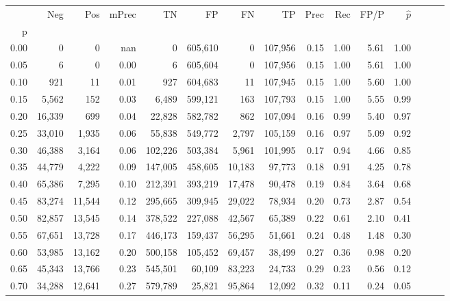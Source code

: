 \begin{tabular}{rrrrrrrrrrrrrrr}
\toprule
{} &     Neg &     Pos & mPrec &       TN &       FP &       FN &       TP &  Prec &   Rec &  FP/P & $\hat{p}$ \\
p    &         &         &       &          &          &          &          &       &       &       &           \\
\midrule
0.00 &       0 &       0 &   nan &        0 &  605,610 &        0 &  107,956 &  0.15 &  1.00 &  5.61 &      1.00 \\
0.05 &       6 &       0 &  0.00 &        6 &  605,604 &        0 &  107,956 &  0.15 &  1.00 &  5.61 &      1.00 \\
0.10 &     921 &      11 &  0.01 &      927 &  604,683 &       11 &  107,945 &  0.15 &  1.00 &  5.60 &      1.00 \\
0.15 &   5,562 &     152 &  0.03 &    6,489 &  599,121 &      163 &  107,793 &  0.15 &  1.00 &  5.55 &      0.99 \\
0.20 &  16,339 &     699 &  0.04 &   22,828 &  582,782 &      862 &  107,094 &  0.16 &  0.99 &  5.40 &      0.97 \\
0.25 &  33,010 &   1,935 &  0.06 &   55,838 &  549,772 &    2,797 &  105,159 &  0.16 &  0.97 &  5.09 &      0.92 \\
0.30 &  46,388 &   3,164 &  0.06 &  102,226 &  503,384 &    5,961 &  101,995 &  0.17 &  0.94 &  4.66 &      0.85 \\
0.35 &  44,779 &   4,222 &  0.09 &  147,005 &  458,605 &   10,183 &   97,773 &  0.18 &  0.91 &  4.25 &      0.78 \\
0.40 &  65,386 &   7,295 &  0.10 &  212,391 &  393,219 &   17,478 &   90,478 &  0.19 &  0.84 &  3.64 &      0.68 \\
0.45 &  83,274 &  11,544 &  0.12 &  295,665 &  309,945 &   29,022 &   78,934 &  0.20 &  0.73 &  2.87 &      0.54 \\
0.50 &  82,857 &  13,545 &  0.14 &  378,522 &  227,088 &   42,567 &   65,389 &  0.22 &  0.61 &  2.10 &      0.41 \\
0.55 &  67,651 &  13,728 &  0.17 &  446,173 &  159,437 &   56,295 &   51,661 &  0.24 &  0.48 &  1.48 &      0.30 \\
0.60 &  53,985 &  13,162 &  0.20 &  500,158 &  105,452 &   69,457 &   38,499 &  0.27 &  0.36 &  0.98 &      0.20 \\
0.65 &  45,343 &  13,766 &  0.23 &  545,501 &   60,109 &   83,223 &   24,733 &  0.29 &  0.23 &  0.56 &      0.12 \\
0.70 &  34,288 &  12,641 &  0.27 &  579,789 &   25,821 &   95,864 &   12,092 &  0.32 &  0.11 &  0.24 &      0.05 \\

\end{tabular}
